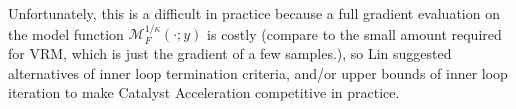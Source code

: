 \documentclass[12pt]{article}
\begin{document}
            Unfortunately, this is a difficult in practice because a full gradient evaluation on the model function $\mathcal M^{1/\kappa}_F(\cdot; y)$ is costly (compare to the small amount required for VRM, which is just the gradient of a few samples.), so Lin suggested alternatives of inner loop termination criteria, and/or upper bounds of inner loop iteration to make Catalyst Acceleration competitive in practice. 
\end{document}
